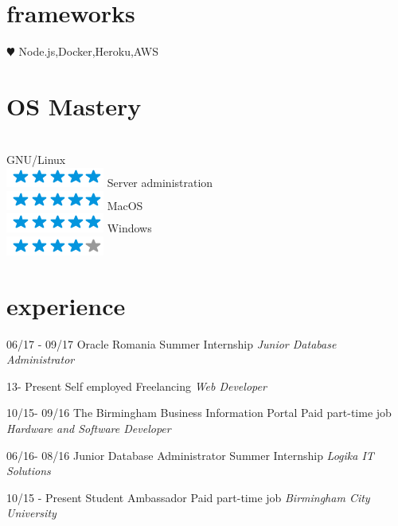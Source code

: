 \documentclass[]{friggeri-cv}
\begin{document}
\begin{aside}
  \section{frameworks}
    {\color{red} $\varheartsuit$} 
    Node.js,Docker,Heroku,AWS
    
  \section{OS Mastery}
  \\GNU/Linux \\ \includegraphics[scale=0.30]{img/5stars.png}
  Server administration \\ \includegraphics[scale=0.30]{img/5stars.png}
  MacOS \\ \includegraphics[scale=0.30]{img/5stars.png}
  Windows \\ \includegraphics[scale=0.30]{img/4stars.png}
\end{aside}

\section{experience}
\begin{entrylist}
    \entry
  {06/17 - 09/17}
  {Oracle Romania}
  {Summer Internship}
  {\emph{Junior Database Administrator}}
 
  \entry
  {13- Present}
  {Self employed}
  {Freelancing}
  {\emph{Web Developer}}
 
  \entry
  {10/15- 09/16}
  {The Birmingham Business Information Portal}
  {Paid part-time job}
  {\emph{Hardware and Software Developer}}
  
  \entry
  {06/16- 08/16}
  {Junior Database Administrator}
  {Summer Internship}
  {\emph{Logika IT Solutions}}
  
  \entry
  {10/15 - Present}
  {Student Ambassador}
  {Paid part-time job}
  {\emph{Birmingham City University}}
  
\end{entrylist}
\end{document}

